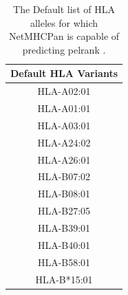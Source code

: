 \begin{table}[h]
    \centering %
    \begin{tabular}{||c||}
        \hline
        Default HLA Variants \\
        \hline
        \hline
        HLA-A02:01           \\
        HLA-A01:01           \\
        HLA-A03:01           \\
        HLA-A24:02           \\
        HLA-A26:01           \\
        HLA-B07:02           \\
        HLA-B08:01           \\
        HLA-B27:05           \\
        HLA-B39:01           \\
        HLA-B40:01           \\
        HLA-B58:01           \\
        HLA-B*15:01          \\
        \hline
    \end{tabular}
    \caption{The Default list of HLA alleles for which NetMHCPan is capable of predicting \ac{pelrank} \cite{reynissonNetMHCpan4NetMHCIIpan4Improved2020}.}
    \label{table:NetMHCPan_default_hla}
\end{table}